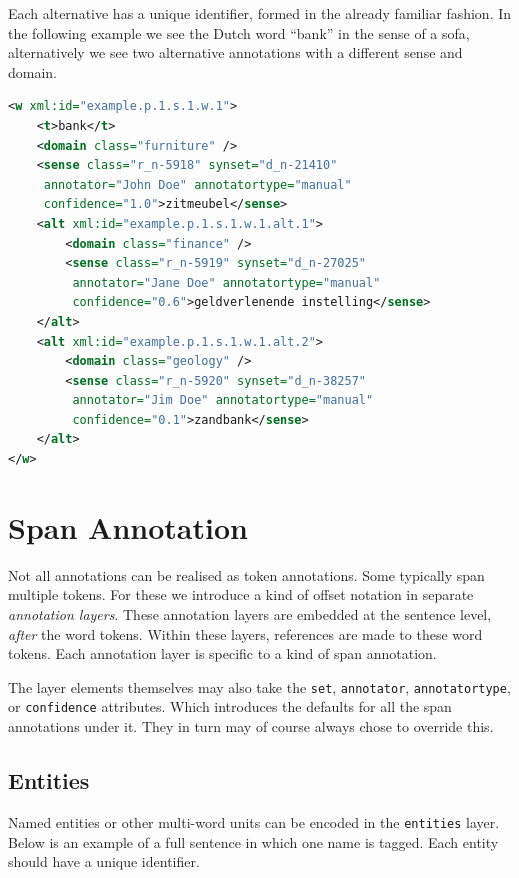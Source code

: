 \documentclass[a4paper,12pt]{report}
\begin{document}
Each alternative has a unique identifier, formed in the already familiar fashion. In the following example we see the Dutch word ``bank'' in the sense of a sofa, alternatively we see two alternative annotations with a different sense and domain.

\begin{lstlisting}[language=xml]
<w xml:id="example.p.1.s.1.w.1">
    <t>bank</t>
    <domain class="furniture" />
    <sense class="r_n-5918" synset="d_n-21410" 
     annotator="John Doe" annotatortype="manual" 
     confidence="1.0">zitmeubel</sense>
    <alt xml:id="example.p.1.s.1.w.1.alt.1">
        <domain class="finance" />
        <sense class="r_n-5919" synset="d_n-27025"
         annotator="Jane Doe" annotatortype="manual" 
         confidence="0.6">geldverlenende instelling</sense>        
    </alt>
    <alt xml:id="example.p.1.s.1.w.1.alt.2">
        <domain class="geology" />
        <sense class="r_n-5920" synset="d_n-38257"
         annotator="Jim Doe" annotatortype="manual"
         confidence="0.1">zandbank</sense>        
    </alt>    
</w>
\end{lstlisting}


\section{Span Annotation}

Not all annotations can be realised as token annotations. Some typically span multiple tokens. For these we introduce a kind of offset notation in separate \emph{annotation layers}. These annotation layers are embedded at the sentence level, \emph{after} the word tokens. Within these layers, references are made to these word tokens. Each annotation layer is specific to a kind of span annotation.

The layer elements themselves may also take the \texttt{set}, \texttt{annotator}, \texttt{annotatortype}, or \texttt{confidence} attributes. Which introduces the defaults for all the span annotations under it. They in turn may of course always chose to override this.

\subsection{Entities}

Named entities or other multi-word units can be encoded in the \texttt{entities} layer. Below is an example of a full sentence in which one name is tagged. Each entity should have a unique identifier.
\end{document}
